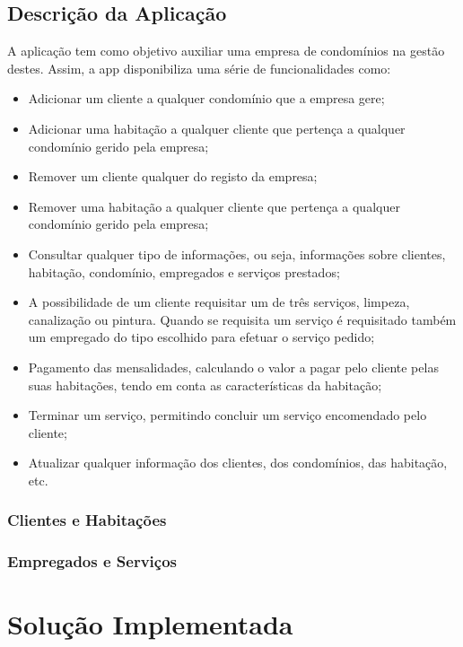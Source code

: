 \documentclass[a4paper]{article}
\begin{document}
\subsection{Descrição da Aplicação}

A aplicação tem como objetivo auxiliar uma empresa de condomínios na gestão destes. Assim, a app disponibiliza uma série de funcionalidades como:

\begin{itemize}
	\item Adicionar um cliente a qualquer condomínio que a empresa gere;
	\item Adicionar uma habitação a qualquer cliente que pertença a qualquer condomínio gerido pela empresa;
	\item Remover um cliente qualquer do registo da empresa;
	\item	Remover uma habitação a qualquer cliente que pertença a qualquer condomínio gerido pela empresa;
	\item Consultar qualquer tipo de informações, ou seja, informações sobre clientes, habitação, condomínio, empregados e serviços prestados;
	\item A possibilidade de um cliente requisitar um de três serviços, limpeza, canalização ou pintura. Quando se requisita um serviço é requisitado também um empregado do tipo escolhido para efetuar o serviço pedido;
	\item Pagamento das mensalidades, calculando o valor a pagar pelo cliente pelas suas habitações, tendo em conta as características da habitação;
	\item Terminar um serviço, permitindo concluir um serviço encomendado pelo cliente;
	\item Atualizar qualquer informação dos clientes, dos condomínios, das habitação, etc.
\end{itemize}

\subsubsection{Clientes e Habitações}



\subsubsection{Empregados e Serviços}

\newpage

\section{Solução Implementada}
\end{document}
